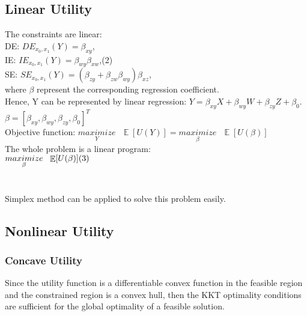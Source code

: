 \documentclass{article} %
\DeclareMathOperator{\E}{\mathbb{E}}
\begin{document}
\subsection{Linear Utility}
\hspace*{1em}The constraints are linear:\\
\hspace*{5em}DE:  $DE_{x_0,x_1}(Y) = \beta_{xy}$,\\
\hspace*{5em}IE: $IE_{x_0,x_1}(Y) = \beta_{wy}\beta_{xw}$,\hfill(2)\\
\hspace*{5em}SE: $SE_{x_0,x_1}(Y) = (\beta_{zy}+\beta_{zw}\beta_{wy})\beta_{xz}$,\\
\hspace*{1em}where $\beta$ represent the corresponding regression coefficient.\\
Hence, Y can be represented by linear regression: $Y = \beta_{xy}X+\beta_{wy}W+\beta_{zy}Z + \beta_0.$\\
$\beta = [\beta_{xy}, \beta_{wy}, \beta_{zy}, \beta_0]^T$\\
Objective function: $\underset{Y}{maximize}\,\,\,\, \E[U(Y)]=\underset{\beta}{maximize}\,\,\,\, \E[U(\beta)]$\\
The whole problem is a linear program:\\
\hspace*{12em}$ \underset{\beta}{maximize}\,\,\,\, \E[U(\beta)] \hfill (3)$\\
\\
\\
\hspace*{1em}Simplex method can be applied to solve this problem easily.\\
\subsection{Nonlinear Utility}
\subsubsection{Concave Utility}
\hspace*{1em}Since the utility function is a differentiable convex function in the feasible region and the constrained region is a convex hull, then the KKT optimality conditions are sufficient for the global optimality of a feasible solution. 
\end{document}
